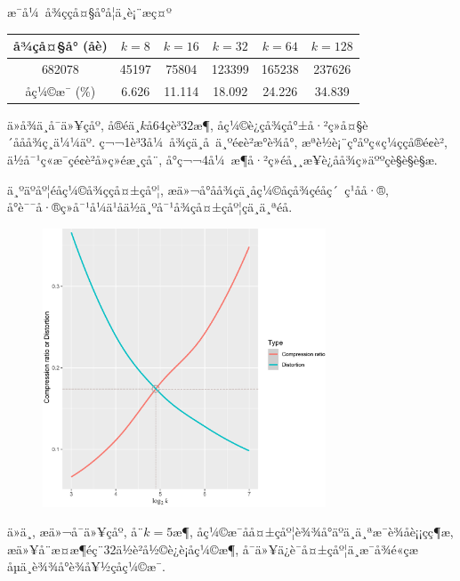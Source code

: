 \documentclass[lang=cn,11pt]{elegantpaper}
\begin{document}
æ¯å¼ å¾ççå¤§å°å¦ä¸è¡¨æç¤º
\begin{table}[h]
    \centering
    \begin{tabular}{c|ccccc}
    \hline
    å¾çå¤§å° (å­è)  & $k=8$   & $k=16$   & $k=32$   & $k=64$   & $k=128$  \\ \hline
    682078   & 45197 & 75804  & 123399 & 165238 & 237626 \\
    åç¼©æ¯ (\%) & 6.626 & 11.114 & 18.092 & 24.226 & 34.839 \\ \hline
    \end{tabular}
\end{table}

ä»å¾ä¸­å¯ä»¥çåº, å®éä¸$k$å64çè³32æ¶, åç¼©è¿çå¾çå°±å·²ç»å¤§è´ååå¾ç¸ä¼¼äº. ç¬¬1è³3å¼ å¾çä¸­å ä¸ºé¢è²æ°è¾å°, æªè½è¡¨ç°åºç«ç¼ççå®é¢è², ä½å¯¹ç«æ¯çé¢è²å»ç»éæ¸çå¨, å°ç¬¬4å¼ æ¶å·²ç»éå¸¸æ¥è¿åå¾ç»äººçè§è§è§æ. 

ä¸ºäºåº¦éåç¼©å¾ççå¤±çåº¦, æä»¬å°åå¾çä¸åç¼©åçå¾çéåç´ ç¹åå·®, å°è¯¯å·®ç»å¯¹å¼ä¹åä½ä¸ºå¯¹å¾çå¤±çåº¦çä¸ä¸ªéå. 

\begin{figure}[ht]
    \centering

    \hspace{50pt}\includegraphics[width=0.75\textwidth]{cat1to}
    \caption{\label{cat2tradeoff}}
\end{figure}

ä»ä¸­, æä»¬å¯ä»¥çåº, å¨$k=5$æ¶, åç¼©æ¯åå¤±çåº¦è¾¾å°äºä¸ä¸ªæ¯è¾åè¡¡çç¶æ, æä»¥å¨æ­¤æ¶éç¨32ä½è²å½©è¿è¡åç¼©æ¶, å¯ä»¥ä¿è¯å¤±çåº¦ä¸æ¯å¾é«çæåµä¸è¾¾å°è¾å¥½çåç¼©æ¯. 
\end{document}
